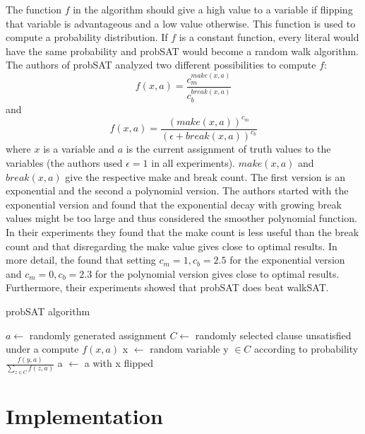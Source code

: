 \documentclass[12pt,a4paper]{article}
\begin{document}
The function $f$ in the algorithm should give a high value to a variable if flipping that variable is advantageous and a low value otherwise. This function is used to compute a probability distribution. If $f$ is a constant function, every literal would have the same probability and probSAT would become a random walk algorithm. \\
The authors of probSAT analyzed two different possibilities to compute $f$:\\
$$f(x,a) = \frac{c_m^{make(x,a)}}{c_b^{break(x,a)}}$$
and
$$f(x,a) = \frac{(make(x,a))^{c_m}}{(\epsilon + break(x,a))^{c_b}}$$
where $x$ is a variable and $a$ is the current assignment of truth values to the variables (the authors used $\epsilon = 1$ in all experiments). $make(x,a)$ and $break(x,a)$ give the respective make and break count. The first version is an exponential and the second a polynomial version. The authors started with the exponential version and found that the exponential decay with growing break values might be too large and thus considered the smoother polynomial function.\\
In their experiments they found that the make count is less useful than the break count and that disregarding the make value gives close to optimal results. In more detail, the found that setting $c_m = 1, c_b = 2.5$ for the exponential version and $c_m = 0, c_b = 2.3$ for the polynomial version gives close to optimal results. \\
Furthermore, their experiments showed that probSAT does beat walkSAT.
\begin{algorithm}[h]
  \caption{probSAT algorithm}
  \label{alg:probSAT}
  \begin{algorithmic}[1]
    \State $a \leftarrow$ randomly generated assignment
    \State {}
    \EndIf
    \State $C \leftarrow$ randomly selected clause unsatisfied under a
       \State compute $f(x,a)$
    \EndFor
    \State x $\leftarrow$ random variable y $\in C$ according to probability $\frac{f(y,a)}{\sum_{z \in C}f(z,a)}$
    \State a $\leftarrow$ a with x flipped
    \EndFor
    \EndFor
    \State {}
    \EndProcedure
  \end{algorithmic}
\end{algorithm}  
\section{Implementation}
\end{document}
